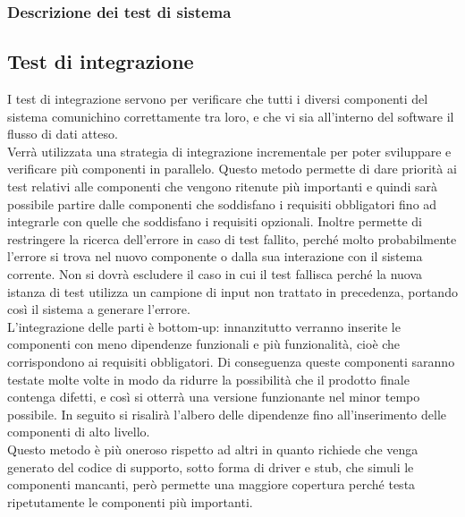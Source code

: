 		\subsubsection{Descrizione dei test di sistema}
			
			
			
	\subsection{Test di integrazione}
	\label{testDiIntegrazione}
		I test di integrazione servono per verificare che tutti i diversi componenti del sistema comunichino correttamente tra loro, e che vi sia all'interno del software il flusso di dati atteso. \\
		Verrà utilizzata una strategia di integrazione incrementale per poter sviluppare e verificare più componenti in parallelo. Questo metodo permette di dare priorità ai test relativi alle componenti che vengono ritenute più importanti e quindi sarà possibile partire dalle componenti che soddisfano i requisiti obbligatori fino ad integrarle con quelle che soddisfano i requisiti opzionali. Inoltre permette di restringere la ricerca dell'errore in caso di test fallito, perché molto probabilmente l'errore si trova nel nuovo componente o dalla sua interazione con il sistema corrente. Non si dovrà escludere il caso in cui il test fallisca perché la nuova istanza di test utilizza un campione di input non trattato in precedenza, portando così il sistema a generare l'errore. \\
		L'integrazione delle parti è bottom-up: innanzitutto verranno inserite le componenti con meno dipendenze funzionali e più funzionalità, cioè che corrispondono ai requisiti obbligatori. Di conseguenza queste componenti saranno testate molte volte in modo da ridurre la possibilità che il prodotto finale contenga difetti, e così si otterrà una versione funzionante nel minor tempo possibile. In seguito si risalirà l'albero delle dipendenze fino all'inserimento delle componenti di alto livello. \\
		Questo metodo è più oneroso rispetto ad altri in quanto richiede che venga generato del codice di supporto, sotto forma di driver e stub, che simuli le componenti mancanti, però permette una maggiore copertura perché testa ripetutamente le componenti più importanti.
		
		
		
		
